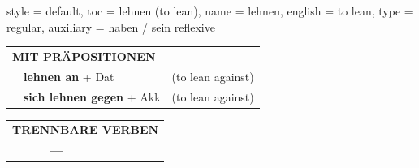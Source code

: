 \begin{verbentry}{
  style = {default},
  toc = {lehnen (to lean)},
  name = {lehnen},
  english = {to lean},
  type = {regular},
  auxiliary = {haben / sein reflexive}
}
\vspace{10pt}

\begin{tabular}{lll}
\multicolumn{3}{l}{\textbf{MIT PRÄPOSITIONEN}}\\
& \textbf{lehnen an} + Dat & (to lean against)\\
& \textbf{sich lehnen gegen} + Akk & (to lean against)\\
\end{tabular}
\hfill
\begin{tabular}{lll}
\multicolumn{3}{l}{\textbf{TRENNBARE VERBEN}}\\
& \textbf{---} & \\
\end{tabular}
\vspace{-5pt}
\end{verbentry}

